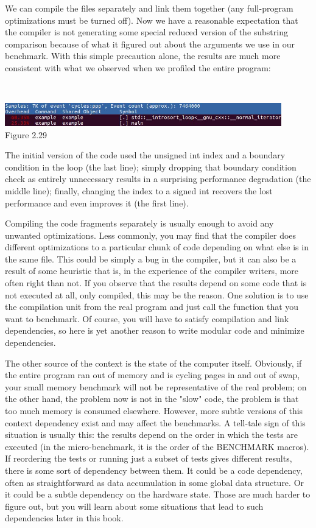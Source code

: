 We can compile the files separately and link them together (any full-program optimizations must be turned off). Now we have a reasonable expectation that the compiler is not generating some special reduced version of the substring comparison because of what it figured out about the arguments we use in our benchmark. With this simple precaution alone, the results are much more consistent with what we observed when we profiled the entire program:

\hspace*{\fill} \\ %
\begin{center}
\includegraphics[width=0.9\textwidth]{content/1/chapter2/images/29.jpg}\\
Figure 2.29
\end{center}

The initial version of the code used the unsigned int index and a boundary condition in the loop (the last line); simply dropping that boundary condition check as entirely unnecessary results in a surprising performance degradation (the middle line); finally, changing the index to a signed int recovers the lost performance and even improves it (the first line).

Compiling the code fragments separately is usually enough to avoid any unwanted optimizations. Less commonly, you may find that the compiler does different optimizations to a particular chunk of code depending on what else is in the same file. This could be simply a bug in the compiler, but it can also be a result of some heuristic that is, in the experience of the compiler writers, more often right than not. If you observe that the results depend on some code that is not executed at all, only compiled, this may be the reason. One solution is to use the compilation unit from the real program and just call the function that you want to benchmark. Of course, you will have to satisfy compilation and link dependencies, so here is yet another reason to write modular code and minimize dependencies.

The other source of the context is the state of the computer itself. Obviously, if the entire program ran out of memory and is cycling pages in and out of swap, your small memory benchmark will not be representative of the real problem; on the other hand, the problem now is not in the "slow" code, the problem is that too much memory is consumed elsewhere. However, more subtle versions of this context dependency exist and may affect the benchmarks. A tell-tale sign of this situation is usually this: the results depend on the order in which the tests are executed (in the micro-benchmark, it is the order of the BENCHMARK macros). If reordering the tests or running just a subset of tests gives different results, there is some sort of dependency between them. It could be a code dependency, often as straightforward as data accumulation in some global data structure. Or it could be a subtle dependency on the hardware state. Those are much harder to figure out, but you will learn about some situations that lead to such dependencies later in this book.

